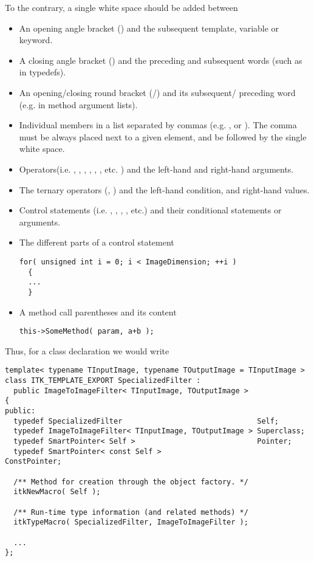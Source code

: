 To the contrary, a single white space should be added between
\begin{itemize}
\item An opening angle bracket (\code{<}) and the subsequent template,
variable or keyword.
\item A closing angle bracket (\code{>}) and the preceding and subsequent
words (such as in typedefs).
\item An opening/closing round bracket (\code{(}/\code{)}) and its subsequent/
preceding word (e.g. in method argument lists).
\item Individual members in a list separated by commas (e.g.
, or ). The comma must be
always placed next to a given element, and be followed by the single white space.
\item Operators(i.e. \code{+}, \code{-}, \code{=}, \code{==}, \code{+=},
\code{<<}, etc. ) and the left-hand and right-hand arguments.
\item The ternary operators (, \code{:}) and the left-hand condition,
and right-hand values.
\item Control statements (i.e. , , ,
, etc.) and their conditional statements or arguments.
\item The different parts of a  control statement

\small
\begin{verbatim}
for( unsigned int i = 0; i < ImageDimension; ++i )
  {
  ...
  }
\end{verbatim}
\normalsize

\item A method call parentheses and its content

\small
\begin{verbatim}
this->SomeMethod( param, a+b );
\end{verbatim}
\normalsize

\end{itemize}

Thus, for a class declaration we would write

\small
\begin{verbatim}
template< typename TInputImage, typename TOutputImage = TInputImage >
class ITK_TEMPLATE_EXPORT SpecializedFilter :
  public ImageToImageFilter< TInputImage, TOutputImage >
{
public:
  typedef SpecializedFilter                               Self;
  typedef ImageToImageFilter< TInputImage, TOutputImage > Superclass;
  typedef SmartPointer< Self >                            Pointer;
  typedef SmartPointer< const Self >                      ConstPointer;

  /** Method for creation through the object factory. */
  itkNewMacro( Self );

  /** Run-time type information (and related methods) */
  itkTypeMacro( SpecializedFilter, ImageToImageFilter );

  ...
};
\end{verbatim}
\normalsize

